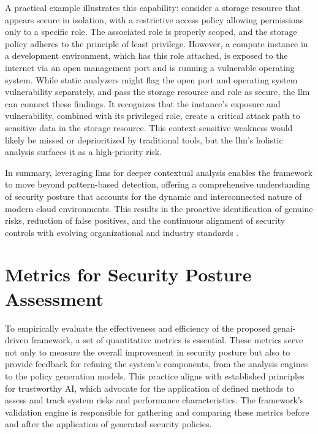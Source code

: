 A practical example illustrates this capability: consider a storage resource that appears secure in isolation, with a restrictive access policy allowing permissions only to a specific role. The associated role is properly scoped, and the storage policy adheres to the principle of least privilege. However, a compute instance in a development environment, which has this role attached, is exposed to the internet via an open management port and is running a vulnerable operating system. While static analyzers might flag the open port and operating system vulnerability separately, and pass the storage resource and role as secure, the \gls{llm} can connect these findings. It recognizes that the instance’s exposure and vulnerability, combined with its privileged role, create a critical attack path to sensitive data in the storage resource. This context-sensitive weakness would likely be missed or deprioritized by traditional tools, but the \gls{llm}’s holistic analysis surfaces it as a high-priority risk.

In summary, leveraging \glspl{llm} for deeper contextual analysis enables the framework to move beyond pattern-based detection, offering a comprehensive understanding of security posture that accounts for the dynamic and interconnected nature of modern cloud environments. This results in the proactive identification of genuine risks, reduction of false positives, and the continuous alignment of security controls with evolving organizational and industry standards \cite{haque_sok_2025}.


\section{Metrics for Security Posture Assessment} %
\label{sec:Metrics for Security Posture Assessment}

To empirically evaluate the effectiveness and efficiency of the proposed \gls{genai}-driven framework, a set of quantitative metrics is essential. These metrics serve not only to measure the overall improvement in security posture but also to provide feedback for refining the system's components, from the analysis engines to the policy generation models. This practice aligns with established principles for trustworthy AI, which advocate for the application of defined methods to assess and track system risks and performance characteristics. The framework's validation engine is responsible for gathering and comparing these metrics before and after the application of generated security policies.

